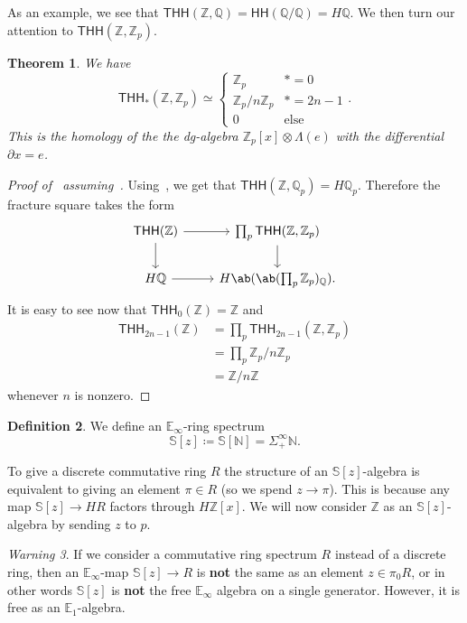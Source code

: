\documentclass[10pt, oneside]{memoir}
\newtheorem{thm}{Theorem}[subsection]
\theoremstyle{definition}
\newtheorem{defn}[thm]{Definition}
\theoremstyle{remark}
\newtheorem{warn}[thm]{Warning}
\theoremstyle{plain}
\theoremstyle{definition}
\theoremstyle{remark}
\newcommand{\N}{\mathbb{N}}
\newcommand{\Z}{\mathbb{Z}}
\newcommand{\Q}{\mathbb{Q}}
\newcommand{\E}{\mathbb{E}}
\newcommand{\bS}{\mathbb{S}}
\newcommand{\ms}[1]{\mathsf{#1}}
\newcommand{\1}{\mathbf{1}}
\newcommand{\2}{\mathbf{2}}
\newcommand{\3}{\mathbf{3}}
\newcommand{\THH}{\ms{THH}}
\newcommand{\HH}{\ms{HH}}
\begin{document}
As an example, we see that $\THH(\Z, \Q) = \HH(\Q/\Q) = H\Q$. We then turn our attention to $\THH(\Z, \Z_p)$.

\begin{thm}\label{thm:thhofzzpcoeff}
    We have
    \[ \THH_*(\Z, \Z_p) \simeq \begin{cases}
        \Z_p & * = 0 \\
        \Z_p / n\Z_p & * = 2n-1 \\
        0 & \text{else}
    \end{cases}. \]
    This is the homology of the the dg-algebra $\Z_p[x] \otimes \Lambda(e)$ with the differential $\partial x = e$.
\end{thm}

\begin{proof}[Proof of~ assuming~]
    Using~, we get that $\THH(\Z, \Q_p) = H \Q_p$. Therefore the fracture square takes the form
    \begin{equation*}
    \begin{tikzcd}
        \THH(\Z) \ar{r} \ar{d} & \prod_{p} \THH(\Z, \Z_p) \ar{d} \\
        H\Q \ar{r} & H \ab(\ab(\prod_p \Z_p)_{\Q}).
    \end{tikzcd}
    \end{equation*}
    It is easy to see now that $\THH_0(\Z) = \Z$ and 
    \begin{align*}
        \THH_{2n-1}(\Z) &= \prod_p \THH_{2n-1}(\Z, \Z_p) \\
        &= \prod_p \Z_p / n\Z_p \\
        &= \Z/n\Z
    \end{align*}
    whenever $n$ is nonzero.
\end{proof}

\begin{defn}
    We define an $\E_{\infty}$-ring spectrum
    \[ \bS [ z] \coloneqq \bS[\N] = \Sigma_+^{\infty} \N. \]
\end{defn}

To give a discrete commutative ring $R$ the structure of an $\bS[z]$-algebra is equivalent to giving an element $\pi \in R$ (so we spend $z \to \pi$). This is because any map $\bS[z] \to HR$ factors through $H\Z[x]$. We will now consider $\Z$ as an $\bS[z]$-algebra by sending $z$ to $p$.

\begin{warn}
    If we consider a commutative ring spectrum $R$ instead of a discrete ring, then an $\E_{\infty}$-map $\bS[z] \to R$ is \textbf{not} the same as an element $z \in \pi_0 R$, or in other words $\bS[z]$ is \textbf{not} the free $\E_{\infty}$ algebra on a single generator. However, it is free as an $\E_1$-algebra.
\end{warn}
\end{document}
